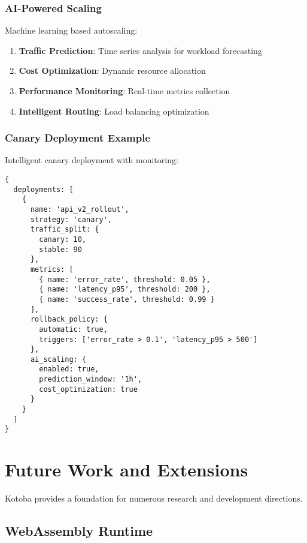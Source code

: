 \documentclass[11pt,a4paper]{article}
\begin{document}
\subsubsection{AI-Powered Scaling}
\label{subsubsec:ai_scaling}

Machine learning based autoscaling:

\begin{enumerate}
\item \textbf{Traffic Prediction}: Time series analysis for workload forecasting
\item \textbf{Cost Optimization}: Dynamic resource allocation
\item \textbf{Performance Monitoring}: Real-time metrics collection
\item \textbf{Intelligent Routing}: Load balancing optimization
\end{enumerate}

\subsubsection{Canary Deployment Example}
\label{subsubsec:canary_example}

Intelligent canary deployment with monitoring:

\begin{lstlisting}[language=jsonnet,caption=Canary Deployment]
{
  deployments: [
    {
      name: 'api_v2_rollout',
      strategy: 'canary',
      traffic_split: {
        canary: 10,
        stable: 90
      },
      metrics: [
        { name: 'error_rate', threshold: 0.05 },
        { name: 'latency_p95', threshold: 200 },
        { name: 'success_rate', threshold: 0.99 }
      ],
      rollback_policy: {
        automatic: true,
        triggers: ['error_rate > 0.1', 'latency_p95 > 500']
      },
      ai_scaling: {
        enabled: true,
        prediction_window: '1h',
        cost_optimization: true
      }
    }
  ]
}
\end{lstlisting}

\section{Future Work and Extensions}
\label{sec:future_work}

Kotoba provides a foundation for numerous research and development directions.

\subsection{WebAssembly Runtime}
\label{subsec:wasm_runtime}
\end{document}
